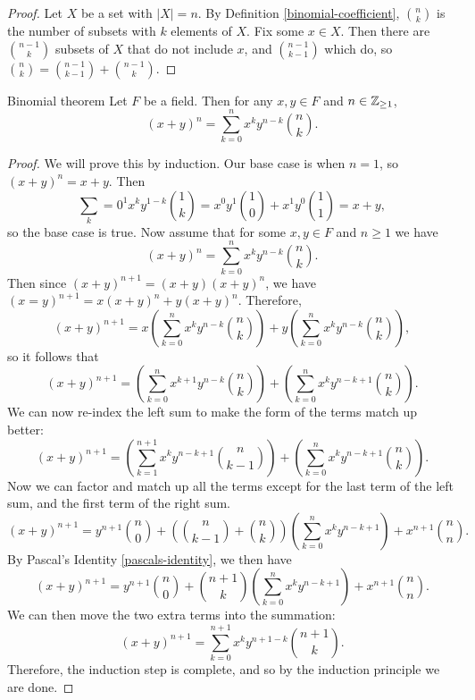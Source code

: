 \begin{proof}
    Let $X$ be a set with $|X| = n$. By Definition \ref{binomial-coefficient}, $\binom{n}{k}$ is the number of subsets with $k$ elements of $X$. Fix some $x \in X$. Then there are $\binom{n-1}{k}$ subsets of $X$ that do not include $x$, and $\binom{n-1}{k-1}$ which do, so $\binom{n}{k} = \binom{n-1}{k-1} + \binom{n-1}{k}$.
\end{proof}

\begin{thm}{Binomial theorem}\label{binomial-theorem}\proofbreak
    Let $F$ be a field. Then for any $x, y \in F$ and $n \in \mathbb{Z}_{\geq 1}$, \[\left(x + y\right)^n = \sum_{k=0}^n x^ky^{n-k}\binom{n}{k}.\]
\end{thm}

\begin{proof}
    We will prove this by induction. Our base case is when $n = 1$, so $(x + y)^n = x + y$. Then \[\sum_k=0^1x^ky^{1-k}\binom{1}{k} = x^0y^1\binom{1}{0} + x^1y^0\binom{1}{1} = x + y,\] so the base case is true.
    Now assume that for some $x, y \in F$ and $n \geq 1$ we have \[\left(x + y\right)^n = \sum_{k=0}^n x^ky^{n-k}\binom{n}{k}.\] Then since $(x + y)^{n+1} = (x+y)(x+y)^n$, we have $(x = y)^{n+1} = x(x+y)^n + y(x+y)^n$.
    Therefore, \[\left(x + y\right)^{n+1} = x\left(\sum_{k=0}^n x^ky^{n-k}\binom{n}{k}\right) + y\left(\sum_{k=0}^n x^ky^{n-k}\binom{n}{k}\right),\] so it follows that \[\left(x + y\right)^{n+1} = \left(\sum_{k=0}^n x^{k+1}y^{n-k}\binom{n}{k}\right) + \left(\sum_{k=0}^n x^ky^{n-k+1}\binom{n}{k}\right).\]
    We can now re-index the left sum to make the form of the terms match up better: \[\left(x + y\right)^{n+1} = \left(\sum_{k=1}^{n+1} x^{k}y^{n-k+1}\binom{n}{k-1}\right) + \left(\sum_{k=0}^n x^ky^{n-k+1}\binom{n}{k}\right).\]
    Now we can factor and match up all the terms except for the last term of the left sum, and the first term of the right sum.
    \[\left(x + y\right)^{n+1} = y^{n+1}\binom{n}{0} + \left(\binom{n}{k-1} + \binom{n}{k}\right)\left(\sum_{k=0}^{n} x^{k}y^{n-k+1}\right) + x^{n+1}\binom{n}{n}.\]
    By Pascal's Identity \ref{pascals-identity}, we then have
    \[\left(x + y\right)^{n+1} = y^{n+1}\binom{n}{0} + \binom{n+1}{k}\left(\sum_{k=0}^{n} x^{k}y^{n-k+1}\right) + x^{n+1}\binom{n}{n}.\]
    We can then move the two extra terms into the summation:
    \[\left(x + y\right)^{n+1} = \sum_{k=0}^{n+1}x^{k}y^{n+1-k}\binom{n+1}{k}.\]
    Therefore, the induction step is complete, and so by the induction principle we are done.
\end{proof}

